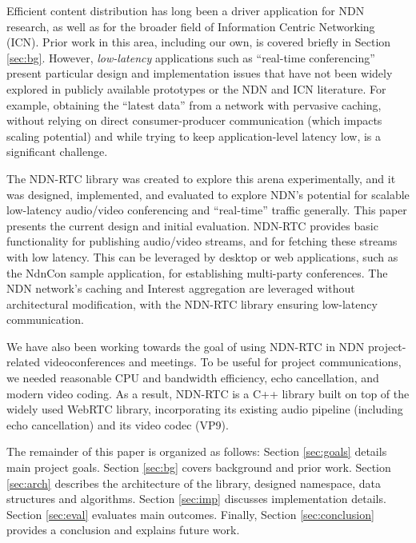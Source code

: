 \documentclass{icn/sig-alternate-2012} %
\newcommand{\ndnrtcName}{NDN-RTC} %
\newcommand{\ndnconName}{NdnCon}
\begin{document}
Efficient content distribution has long been a driver application for NDN research, as well as for the broader field of Information Centric Networking (ICN). Prior work in this area, including our own, is covered briefly in Section \ref{sec:bg}.  However, \emph{low-latency} applications such as ``real-time conferencing'' present particular design and implementation issues that have not been widely explored in publicly available prototypes or the NDN and ICN literature.   For example, obtaining the ``latest data'' from a network with pervasive caching, without relying on direct consumer-producer communication (which impacts scaling potential) and while trying to keep application-level latency low, is a significant challenge.

The \ndnrtcName{} library was created to explore this arena experimentally, and it was designed, implemented, and evaluated to explore NDN's potential for scalable low-latency audio/video conferencing and ``real-time'' traffic generally. This paper presents the current design and initial evaluation.  \ndnrtcName{} provides basic functionality for publishing audio/video streams, and for fetching these streams with low latency.  This can be leveraged by desktop or web applications, such as the \ndnconName{} sample application, for establishing multi-party conferences. The NDN network's caching and Interest aggregation are leveraged without architectural modification, with the \ndnrtcName{} library ensuring low-latency communication. 

We have also been working towards the goal of using \ndnrtcName{} in NDN project-related videoconferences and meetings.  To be useful for project communications, we needed reasonable CPU and bandwidth efficiency, echo cancellation, and  modern video coding. As a result, \ndnrtcName{} is a C++ library built on top of the widely used WebRTC library, incorporating its existing audio pipeline (including echo cancellation) and its video codec (VP9).

The remainder of this paper is organized as follows: Section \ref{sec:goals} details main project goals. Section \ref{sec:bg} covers background and prior work. Section \ref{sec:arch} describes the architecture of the library, designed namespace, data structures and algorithms. Section \ref{sec:imp} discusses implementation details. Section \ref{sec:eval} evaluates main outcomes. Finally, Section \ref{sec:conclusion} provides a conclusion and explains future work.
\end{document}
